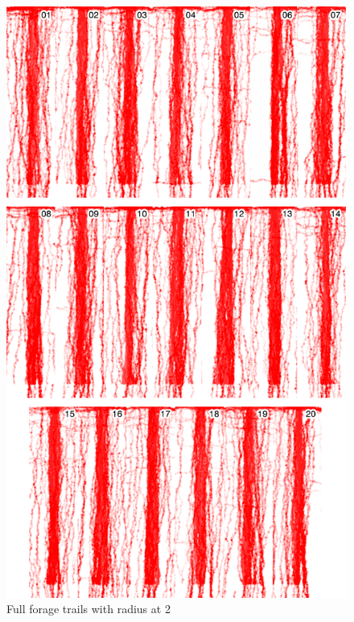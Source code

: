 \begin{figure}[H]
  \centering
  \includegraphics[width=0.8\linewidth]{gfx/radius-2-final.png}
  \caption{Full forage trails with radius at 2}
  \label{fig:radius-2-final}
\end{figure}